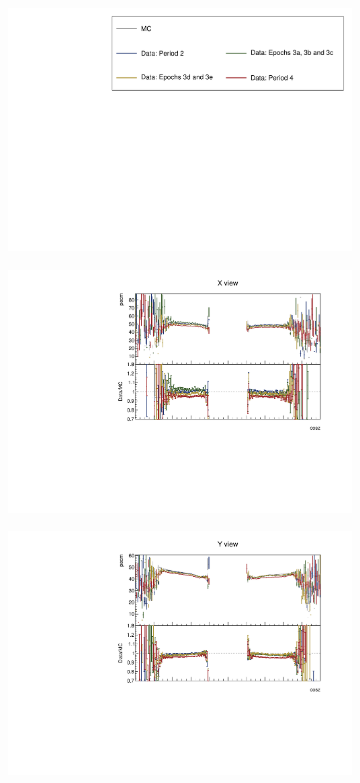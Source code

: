\documentclass[12pt,a4paper]{article}
\begin{document}
\begin{figure}[h!]
  \begin{subfigure}{\textwidth}
  \centering
    \includegraphics[height=0.2\linewidth]{essentialsec_tb/legend.pdf}
  \end{subfigure}
  \vspace*{2mm}
  
  \begin{subfigure}{0.5\textwidth}
    \includegraphics[width=\linewidth]{PlotsAngularDistribution/pecm_cosz_x.pdf}
  \end{subfigure}
  \begin{subfigure}{0.5\textwidth}
    \includegraphics[width=\linewidth]{PlotsAngularDistribution/pecm_cosz_y.pdf}

\end{subfigure}
\end{figure}
\end{document}
